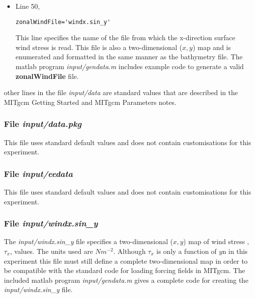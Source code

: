 {\begin{itemize}
\item Line 50,
\begin{verbatim}
zonalWindFile='windx.sin_y'
\end{verbatim}
This line specifies the name of the file from which the x-direction
surface wind stress is read. This file is also a two-dimensional
($x,y$) map and is enumerated and formatted in the same manner as the 
bathymetry file. The matlab program {\it input/gendata.m} includes example 
code to generate a valid 
{\bf zonalWindFile} 
file.  

\end{itemize}

\noindent other lines in the file {\it input/data} are standard values
that are described in the MITgcm Getting Started and MITgcm Parameters
notes.

\begin{small}

\end{small}

\subsubsection{File {\it input/data.pkg}}
\label{www:tutorials}

This file uses standard default values and does not contain
customisations for this experiment.

\subsubsection{File {\it input/eedata}}
\label{www:tutorials}

This file uses standard default values and does not contain
customisations for this experiment.

\subsubsection{File {\it input/windx.sin\_y}}
\label{www:tutorials}

The {\it input/windx.sin\_y} file specifies a two-dimensional ($x,y$) 
map of wind stress ,$\tau_{x}$, values. The units used are $Nm^{-2}$.
Although $\tau_{x}$ is only a function of $y$n in this experiment
this file must still define a complete two-dimensional map in order
to be compatible with the standard code for loading forcing fields 
in MITgcm. The included matlab program {\it input/gendata.m} gives a complete
code for creating the {\it input/windx.sin\_y} file.

}
